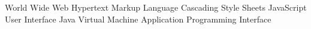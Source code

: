 \begin{acronym}[HTML]
			{World Wide Web}
			{Hypertext Markup Language}
			{Cascading Style Sheets}
			{JavaScript}
			{User Interface}
			{Java Virtual Machine}
   			{Application Programming Interface}
\end{acronym}
